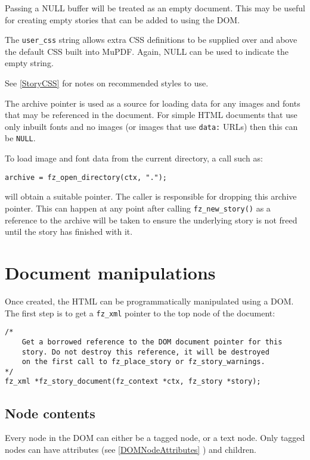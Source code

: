 \documentclass[oneside]{book}
\newcommand{\rjwref}[1] {\autoref{#1} \nameref{#1}}
\begin{document}
Passing a NULL buffer will be treated as an empty document. This may be useful for creating empty stories that can be added to using the DOM.

The \texttt{user\_css} string allows extra CSS definitions to be supplied over and above the default CSS built into MuPDF. Again, NULL can be used to indicate the empty string.

See \rjwref{StoryCSS} for notes on recommended styles to use.

The archive pointer is used as a source for loading data for any images and fonts that may be referenced in the document. For simple HTML documents that use only inbuilt fonts and no images (or images that use \texttt{data:} URLs) then this can be \texttt{NULL}.

To load image and font data from the current directory, a call such as:

\begin{lstlisting}
archive = fz_open_directory(ctx, ".");
\end{lstlisting}

will obtain a suitable pointer. The caller is responsible for dropping this archive pointer. This can happen at any point after calling \texttt{fz\_new\_story()} as a reference to the archive will be taken to ensure the underlying story is not freed until the story has finished with it.

\section{Document manipulations}

Once created, the HTML can be programmatically manipulated using a DOM. The first step is to get a \texttt{fz\_xml} pointer to the top node of the document:

\begin{lstlisting}
/*
	Get a borrowed reference to the DOM document pointer for this
	story. Do not destroy this reference, it will be destroyed
	on the first call to fz_place_story or fz_story_warnings.
*/
fz_xml *fz_story_document(fz_context *ctx, fz_story *story);
\end{lstlisting}

\subsection{Node contents}

Every node in the DOM can either be a tagged node, or a text node. Only tagged nodes can have attributes (see \rjwref{DOMNodeAttributes}) and children.
\end{document}
